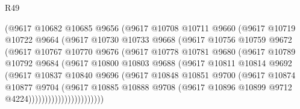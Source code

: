 \begin{lexlean}{R49}
\begin{coremodule}
                    (@9617
                      @10682
                      @10685
                      @9656
                      (@9617
                        @10708
                        @10711
                        @9660
                        (@9617
                          @10719
                          @10722
                          @9664
                          (@9617
                            @10730
                            @10733
                            @9668
                            (@9617
                              @10756
                              @10759
                              @9672
                              (@9617
                                @10767
                                @10770
                                @9676
                                (@9617
                                  @10778
                                  @10781
                                  @9680
                                  (@9617
                                    @10789
                                    @10792
                                    @9684
                                    (@9617
                                      @10800
                                      @10803
                                      @9688
                                      (@9617
                                        @10811
                                        @10814
                                        @9692
                                        (@9617
                                          @10837
                                          @10840
                                          @9696
                                          (@9617
                                            @10848
                                            @10851
                                            @9700
                                            (@9617
                                              @10874
                                              @10877
                                              @9704
                                              (@9617
                                                @10885
                                                @10888
                                                @9708
                                                (@9617
                                                  @10896
                                                  @10899
                                                  @9712
                                                  @4224)))))))))))))))))))))))

\end{coremodule}
\end{lexlean}
